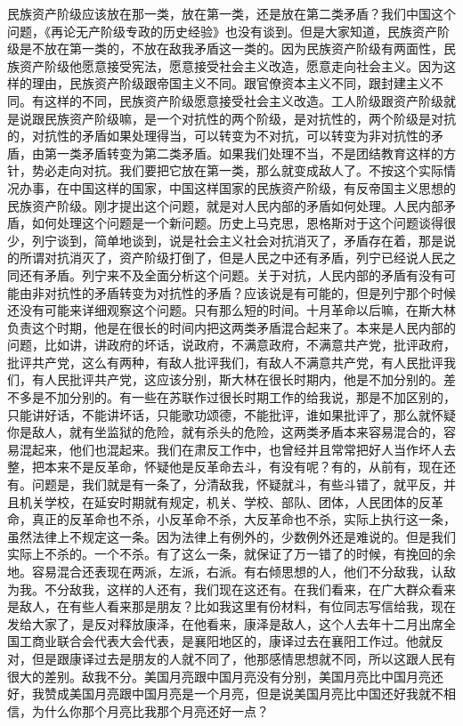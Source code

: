 民族资产阶级应该放在那一类，放在第一类，还是放在第二类矛盾？我们中国这个问题，《再论无产阶级专政的历史经验》也没有谈到。但是大家知道，民族资产阶级是不放在第一类的，不放在敌我矛盾这一类的。因为民族资产阶级有两面性，民族资产阶级他愿意接受宪法，愿意接受社会主义改造，愿意走向社会主义。因为这样的理由，民族资产阶级跟帝国主义不同。跟官僚资本主义不同，跟封建主义不同。有这样的不同，民族资产阶级愿意接受社会主义改造。工人阶级跟资产阶级就是说跟民族资产阶级嘛，是一个对抗性的两个阶级，是对抗性的，两个阶级是对抗的，对抗性的矛盾如果处理得当，可以转变为不对抗，可以转变为非对抗性的矛盾，由第一类矛盾转变为第二类矛盾。如果我们处理不当，不是团结教育这样的方针，势必走向对抗。我们要把它放在第一类，那么就变成敌人了。不按这个实际情况办事，在中国这样的国家，中国这样国家的民族资产阶级，有反帝国主义思想的民族资产阶级。刚才提出这个问题，就是对人民内部的矛盾如何处理。人民内部矛盾，如何处理这个问题是一个新问题。历史上马克思，恩格斯对于这个问题谈得很少，列宁谈到，简单地谈到，说是社会主义社会对抗消灭了，矛盾存在着，那是说的所谓对抗消灭了，资产阶级打倒了，但是人民之中还有矛盾，列宁已经说人民之同还有矛盾。列宁来不及全面分析这个问题。关于对抗，人民内部的矛盾有没有可能由非对抗性的矛盾转变为对抗性的矛盾？应该说是有可能的，但是列宁那个时候还没有可能来详细观察这个问题。只有那么短的时间。十月革命以后嘛，在斯大林负责这个时期，他是在很长的时间内把这两类矛盾混合起来了。本来是人民内部的问题，比如讲，讲政府的坏话，说政府，不满意政府，不满意共产党，批评政府，批评共产党，这么有两种，有敌人批评我们，有敌人不满意共产党，有人民批评我们，有人民批评共产党，这应该分别，斯大林在很长时期内，他是不加分别的。差不多是不加分别的。有一些在苏联作过很长时期工作的给我说，那是不加区别的，只能讲好话，不能讲坏话，只能歌功颂德，不能批评，谁如果批评了，那么就怀疑你是敌人，就有坐监狱的危险，就有杀头的危险，这两类矛盾本来容易混合的，容易混起来，他们也混起来。我们在肃反工作中，也曾经并且常常把好人当作坏人去整，把本来不是反革命，怀疑他是反革命去斗，有没有呢？有的，从前有，现在还有。问题是，我们就是有一条了，分清敌我，怀疑就斗，有些斗错了，就平反，并且机关学校，在延安时期就有规定，机关、学校、部队、团体，人民团体的反革命，真正的反革命也不杀，小反革命不杀，大反革命也不杀，实际上执行这一条，虽然法律上不规定这一条。因为法律上有例外的，少数例外还是难说的。但是我们实际上不杀的。一个不杀。有了这么一条，就保证了万一错了的时候，有挽回的余地。容易混合还表现在两派，左派，右派。有右倾思想的人，他们不分敌我，认敌为我。不分敌我，这样的人还有，我们现在这还有。在我们看来，在广大群众看来是敌人，在有些人看来那是朋友？比如我这里有份材料，有位同志写信给我，现在发给大家了，是反对释放康泽，在他看来，康泽是敌人，这个人去年十二月出席全国工商业联合会代表大会代表，是襄阳地区的，康译过去在襄阳工作过。他就反对，但是跟康译过去是朋友的人就不同了，他那感情思想就不同，所以这跟人民有很大的差别。敌我不分。美国月亮跟中国月亮没有分别，美国月亮比中国月亮还好，我赞成美国月亮跟中国月亮是一个月亮，但是说美国月亮比中国还好我就不相信，为什么你那个月亮比我那个月亮还好一点？

